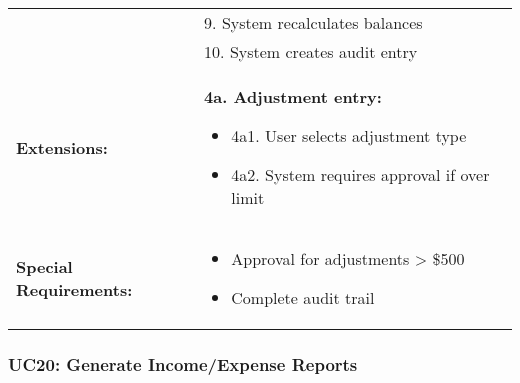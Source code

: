 \documentclass[12pt]{article}
\begin{document}
\begin{tabular}{|p{3cm}|p{11cm}|}
& 9. System recalculates balances \\
& 10. System creates audit entry \\
\hline
\textbf{Extensions:} & 
\textbf{4a. Adjustment entry:}
\begin{itemize}
    \item 4a1. User selects adjustment type
    \item 4a2. System requires approval if over limit
\end{itemize} \\
\hline
\textbf{Special Requirements:} & 
\begin{itemize}
    \item Approval for adjustments > \$500
    \item Complete audit trail
\end{itemize} \\
\hline
\end{tabular}

\subsubsection{UC20: Generate Income/Expense Reports}
\end{document}
